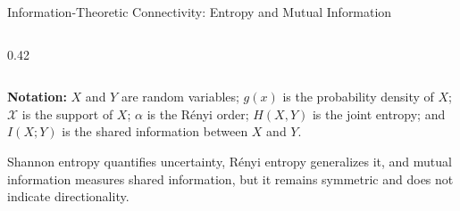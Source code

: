 \documentclass[aspectratio=169]{beamer}
\begin{document}
\begin{frame}{Information-Theoretic Connectivity: Entropy and Mutual Information}
\begin{columns}[T,totalwidth=\textwidth]
\begin{column}{0.42\textwidth}
\end{column}

\end{columns}

\vspace{0.22cm}

{\scriptsize
\textbf{Notation:}
$X$ and $Y$ are random variables;
$g(x)$ is the probability density of $X$;
$\mathcal{X}$ is the support of $X$;
$\alpha$ is the Rényi order;
$H(X,Y)$ is the joint entropy; and
$I(X;Y)$ is the shared information between $X$ and $Y$.
}

\vspace{0.30cm}

{\centering
\color{frameblue}\footnotesize
Shannon entropy quantifies uncertainty, Rényi entropy generalizes it, and mutual information measures shared information, but it remains symmetric and does not indicate directionality.
\par}

\end{frame}


\end{document}
